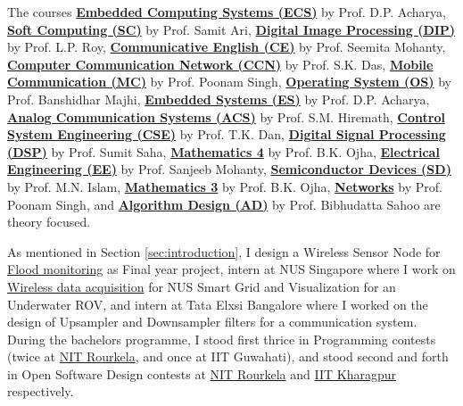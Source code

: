 The courses \textbf{\href{https://github.com/nitrece/embedded-computing-systems}{Embedded Computing Systems (ECS)}} by Prof. D.P. Acharya, \textbf{\href{https://github.com/nitrece/soft-computing}{Soft Computing (SC)}} by Prof. Samit Ari, \textbf{\href{https://github.com/nitrece/digital-image-processing}{Digital Image Processing (DIP)}} by Prof. L.P. Roy, \textbf{\href{https://github.com/nitrece/communicative-english}{Communicative English (CE)}} by Prof. Seemita Mohanty, \textbf{\href{https://github.com/nitrece/computer-communication-network}{Computer Communication Network (CCN)}} by Prof. S.K. Das, \textbf{\href{https://github.com/nitrece/mobile-communication}{Mobile Communication (MC)}} by Prof. Poonam Singh, \textbf{\href{https://github.com/nitrece/operating-systems}{Operating System (OS)}} by Prof. Banshidhar Majhi, \textbf{\href{https://github.com/nitrece/embedded-systems}{Embedded Systems (ES)}} by Prof. D.P. Acharya, \textbf{\href{https://github.com/nitrece/analog-communication-systems}{Analog Communication Systems (ACS)}} by Prof. S.M. Hiremath, \textbf{\href{https://github.com/nitrece/control-systems-engineering}{Control System Engineering (CSE)}} by Prof. T.K. Dan, \textbf{\href{https://github.com/nitrece/digital-signal-processing}{Digital Signal Processing (DSP)}} by Prof. Sumit Saha, \textbf{\href{https://github.com/nitrece/mathematics-4}{Mathematics 4}} by Prof. B.K. Ojha, \textbf{\href{https://github.com/nitrece/electrical-engineering}{Electrical Engineering (EE)}} by Prof. Sanjeeb Mohanty, \textbf{\href{https://github.com/nitrece/semiconductor-devices}{Semiconductor Devices (SD)}} by Prof. M.N. Islam, \textbf{\href{https://github.com/nitrece/mathematics-3}{Mathematics 3}} by Prof. B.K. Ojha, \textbf{\href{https://github.com/nitrece/networks}{Networks}} by Prof. Poonam Singh, and \textbf{\href{https://github.com/nitrece/algorithm-design}{Algorithm Design (AD)}} by Prof. Bibhudatta Sahoo are theory focused.

As mentioned in Section \ref{sec:introduction}, I design a Wireless Sensor Node for \href{https://github.com/nitrece/flood-monitoring}{Flood monitoring} as Final year project, intern at NUS Singapore where I work on \href{https://github.com/nitrece/smart-grid-monitoring}{Wireless data acquisition} for NUS Smart Grid and Visualization for an Underwater ROV, and intern at Tata Elxsi Bangalore where I worked on the design of Upsampler and Downsampler filters for a communication system. During the bachelors programme, I stood first thrice in Programming contests (twice at \href{https://github.com/moocf/code-rage}{NIT Rourkela}, and once at IIT Guwahati), and stood second and forth in Open Software Design contests at \href{https://github.com/moocf/programvare-promoteur}{NIT Rourkela} and \href{https://github.com/moocf/open-soft}{IIT Kharagpur} respectively.




